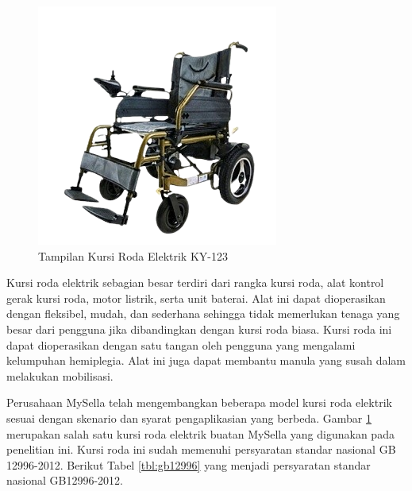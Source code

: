\begin{figure} [ht]
    \centering
        \includegraphics[scale=0.72]{gambar/WheelchairMySellaKY123.png}
        \caption{Tampilan Kursi Roda Elektrik KY-123}
        \label{fig:KY123}
\end{figure}

Kursi roda elektrik sebagian besar terdiri dari rangka kursi roda, alat kontrol gerak kursi roda, motor listrik, serta unit baterai. Alat ini dapat dioperasikan dengan fleksibel, mudah, dan sederhana sehingga tidak memerlukan tenaga yang besar dari pengguna jika dibandingkan dengan kursi roda biasa. Kursi roda ini dapat dioperasikan dengan satu tangan oleh pengguna yang mengalami kelumpuhan hemiplegia. Alat ini juga dapat membantu manula yang susah dalam melakukan mobilisasi. 

Perusahaan MySella telah mengembangkan beberapa model kursi roda elektrik sesuai dengan skenario dan syarat pengaplikasian yang berbeda. Gambar \ref{fig:KY123} merupakan salah satu kursi roda elektrik buatan MySella yang digunakan pada penelitian ini. Kursi roda ini sudah memenuhi persyaratan standar nasional GB 12996-2012. Berikut Tabel \ref{tbl:gb12996} yang menjadi persyaratan standar nasional GB12996-2012.


